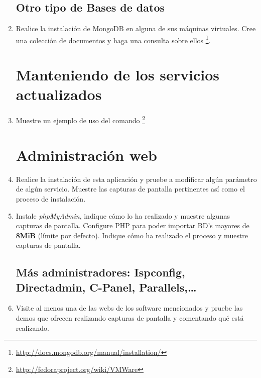 \documentclass[paper=a4, fontsize=11pt]{scrartcl} %
\numberwithin{equation}{section} %
\numberwithin{figure}{section} %
\numberwithin{table}{section} %
\begin{document}
\begin{enumerate}
	\subsection{Otro tipo de Bases de datos}
		\item Realice la instalación de MongoDB en alguna de sus máquinas virtuales. Cree una colección
		de documentos y haga una consulta sobre ellos
		\footnote{\url{http://docs.mongodb.org/manual/installation/}}.
	
	\section{Manteniendo de los servicios actualizados}
		\item Muestre un ejemplo de uso del comando \footnote{\url{http://fedoraproject.org/wiki/VMWare}}
	
	\section{Administración web}
		\item Realice la instalación de esta aplicación y pruebe a modificar algún parámetro de algún
		servicio. Muestre las capturas de pantalla pertinentes así como el proceso de instalación.
		
		\item Instale \textit{phpMyAdmin}, indique cómo lo ha realizado y muestre algunas capturas de
		pantalla. Configure PHP para poder importar BD's mayores de \textbf{8MiB} (límite por defecto).
		Indique cómo ha realizado el proceso y muestre capturas de pantalla.
	
	\subsection{Más administradores: Ispconfig, Directadmin, C-Panel, Parallels,\dots}
		\item Visite al menos una de las webs de los software mencionados y pruebe las demos que
		ofrecen realizando capturas de pantalla y comentando qué está realizando.
	

\end{enumerate}
\end{document}
